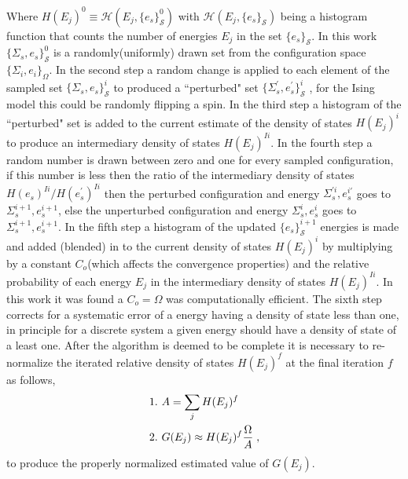 \documentclass[aps,prl,reprint,superscriptaddress,showkeys]{revtex4-1}
\begin{document}
Where  $H(E_j)^0 \equiv \mathcal{H}(E_j,\{e_s\}_{\mathcal{S}}^0)$ with $\mathcal{H}(E_j,\{e_s\}_{\mathcal{S}})$ being a histogram function that counts the number of energies $E_j$ in the set $\{e_s\}_{\mathcal{S}}$. In this work $\{\Sigma_{s},e_s\}_{\mathcal{S}}^0$  is a randomly(uniformly) drawn set from the configuration space $\{ \Sigma_i, e_i \}_\Omega $. In the second step  a random change is applied to each element of the sampled set $\{\Sigma_{s},e_s\}_{\mathcal{S}}^i$ to produced a ``perturbed" set $ \{\Sigma_{s}^{'},e_s^{'}\}_{\mathcal{S}}^i$ , for the Ising model this could be randomly flipping a spin. In the third step a histogram of the ``perturbed" set is added to the current estimate of the density of states $H(E_j)^i$ to produce an intermediary density of states $H(E_j)^{Ii}$. In the fourth step a random number is drawn between zero and one for every sampled configuration, if this number is less then the ratio of the intermediary density of states $H(e_s)^{Ii}/H(e_s^{'})^{Ii}$ then the perturbed configuration and energy  $\Sigma_{s}^{'i},e_s^{i'}$  goes to $\Sigma_{s}^{i+1},e_s^{i+1}$,  else the unperturbed configuration and energy $\Sigma_{s}^{i},e_s^i$  goes to $\Sigma_{s}^{i+1},e_s^{i+1}$. In the fifth step a histogram of the updated $\{ e_s \}^{i+1}_{\mathcal{S}}$ energies is made and added (blended) in to the current density of states $H(E_j)^i$   by multiplying  by a constant $C_{o}$(which affects the convergence properties) and the relative probability of each energy $E_j$ in the  intermediary density of states $H(E_j)^{Ii}$. In this work it was found a $C_{o}=\Omega$ was computationally efficient. The sixth step corrects for a systematic error of a energy having a density of state less than one, in principle for a discrete system a given energy should have a density of state of a least one.  After the algorithm is deemed to be complete it is necessary to re-normalize the iterated relative density of states $H(E_j)^f$ at the final iteration $f$ as follows, 
\begin{equation}
\begin{split}
&1. \hspace{0.125cm} A = \sum_jH(E_j)^f\\
&2. \hspace{0.125cm} G(E_j)\approx H(E_j)^f \frac{\Omega}{A} \;,
\end{split}
\end{equation}
to produce the properly normalized estimated value of $G(E_j)$. 
\end{document}
